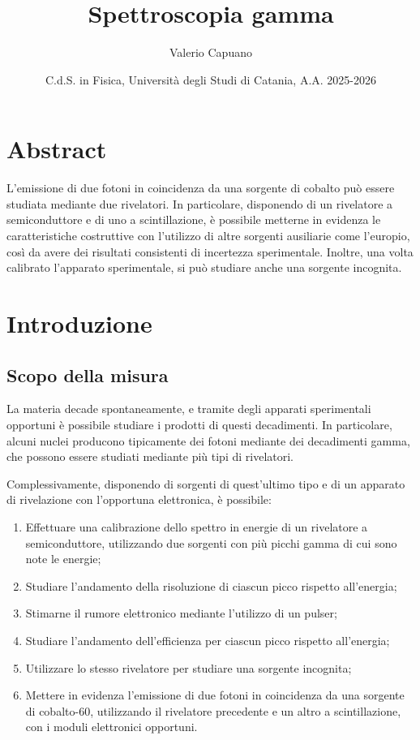 \documentclass{article}
\title{Spettroscopia gamma}
\author{Valerio Capuano}
\date{C.d.S. in Fisica, Università degli Studi di Catania, A.A. 2025-2026}
\begin{document}
    \maketitle
    
    \section*{Abstract}
        L'emissione di due fotoni in coincidenza da una sorgente di cobalto può essere studiata mediante due rivelatori. In particolare, disponendo di un rivelatore a semiconduttore e di uno a scintillazione, è possibile metterne in evidenza le caratteristiche costruttive con l'utilizzo di altre sorgenti ausiliarie come l'europio, così da avere dei risultati consistenti di incertezza sperimentale. Inoltre, una volta calibrato l'apparato sperimentale, si può studiare anche una sorgente incognita.

    \section*{Introduzione}
        \subsection*{Scopo della misura}
            La materia decade spontaneamente, e tramite degli apparati sperimentali opportuni è possibile studiare i prodotti di questi decadimenti. In particolare, alcuni nuclei producono tipicamente dei fotoni mediante dei decadimenti gamma, che possono essere studiati mediante più tipi di rivelatori.

            Complessivamente, disponendo di sorgenti di quest'ultimo tipo e di un apparato di rivelazione con l'opportuna elettronica, è possibile:
            \begin{enumerate}
                \item Effettuare una calibrazione dello spettro in energie di un rivelatore a semiconduttore, utilizzando due sorgenti con più picchi gamma di cui sono note le energie;
                \item Studiare l'andamento della risoluzione di ciascun picco rispetto all'energia;
                \item Stimarne il rumore elettronico mediante l'utilizzo di un pulser;
                \item Studiare l'andamento dell'efficienza per ciascun picco rispetto all'energia;
                \item Utilizzare lo stesso rivelatore per studiare una sorgente incognita;
                \item Mettere in evidenza l'emissione di due fotoni in coincidenza da una sorgente di cobalto-60, utilizzando il rivelatore precedente e un altro a scintillazione, con i moduli elettronici opportuni.
            \end{enumerate}
\end{document}
